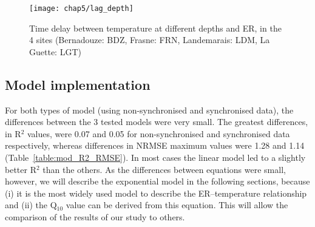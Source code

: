 \begin{figure}[h]
\centering
\texttt{[image: chap5/lag\_depth]}
\caption{Time delay between temperature at different depths and ER, in the 4 sites (Bernadouze: BDZ, Frasne: FRN, Landemarais: LDM, La Guette: LGT)}
\label{fig:lag_depth}
\end{figure}

\subsection{Model implementation}

For both types of model (using non-synchronised and synchronised data), the differences between the 3 tested models were very small. 
The greatest differences, in R$^{2}$ values, were 0.07 and 0.05 for non-synchronised and synchronised data respectively, whereas differences in NRMSE maximum values were 1.28 and 1.14 (Table~\ref{table:mod_R2_RMSE}).
In most cases the linear model led to a slightly better R$^2$ than the others.
As the differences between equations were small, however, we will describe the exponential model in the following sections, because (i) it is the most widely used model to describe the ER--temperature relationship and (ii) the Q$_{10}$ value can be derived from this equation. 
This will allow the comparison of the results of our study to others.

